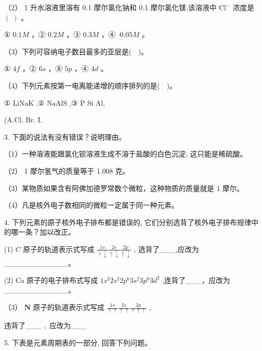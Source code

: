 \documentclass[10pt]{article}
\begin{document}
（2） 1 升水溶液里溶有 0.1 摩尔氯化钠和 0.1 摩尔氯化镁,该溶液中 \({\mathrm{{Cl}}}^{ - }\) 浓度是 \(\left( \;\right)\) 。

① \({0.1M}\) ，② \({0.2M}\) ，③ \({0.3M}\) ，④ \(\cdot {0.05M}\) 。

（3）下列可容纳电子数目最多的亚层是( \(\;\) )。

① \({4f}\) ，② \({6s}\) ，⑧ \({5p}\) ，④ \({4d}\) 。

（4）下列元素按第一电离能递增的顺序排列的是( \(\;\) )。

① \(\mathrm{{Li}}\mathrm{{Na}}\mathrm{K}\) ,② \(\mathrm{{Na}}\mathrm{{Al}}\mathrm{S}\) ,③ P Si Al,

(A.Cl. Br. I.

3. 下面的说法有没有错误？说明理由。

（1）一种溶液能跟氯化钡溶液生成不溶于盐酸的白色沉淀, 这只能是稀硫酸。

（2） 1 摩尔氢气的质量等于 1.008 克。

（3）某物质如果含有阿佛加德罗常数个微粒，这种物质的质量就是 1 摩尔。

（4）凡是核外电子数相同的微粒一定属于同一种元素。

4. 下列元素的原子核外电子排布都是错误的, 它们分别选背了核外电子排布规律中的哪一条？加以改正。

(1) \(C\) 原子的轨道表示式写成 \(\frac{1s}{ \uparrow \downarrow }\frac{2s}{ \uparrow \downarrow }\frac{2p}{ \uparrow \downarrow }\) , 选背了\_\_\_,应改为\_\_\_\_\_\_\_\_\_\_\_\_。

(2) Ca 原子的电子排布式写成 \(1{s}^{2}2{s}^{2}2{p}^{6}3{s}^{2}3{p}^{6}3{d}^{2}\) ,连背了\_\_\_，应改为\_\_\_\_\_\_\_\_\_\_\_\_。

（3） \(\mathbf{N}\) 原子的轨道表示式写成 \(\frac{1s}{ \uparrow \uparrow }\frac{2s}{ \uparrow \uparrow }\frac{2p}{ \uparrow \uparrow \uparrow }\) ,

违背了\_\_\_ \(,\) 应改为\_\_\_

5. 下表是元素周期表的一部分, 回答下列问题。

\begin{center}
\end{center}
\end{document}
